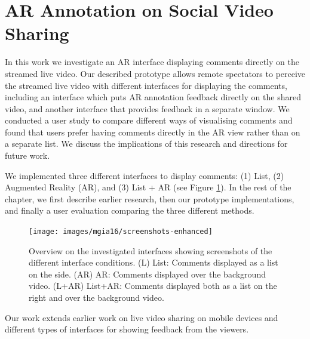 
\section{AR Annotation on Social Video Sharing}
\label{sec:video}

In this work we investigate an AR interface displaying comments directly on the streamed live video. Our described prototype allows remote spectators to perceive the streamed live video with different interfaces for displaying the comments, including an interface which puts AR annotation feedback directly on the shared video, and another interface that provides feedback in a separate window. We conducted a user study to compare different ways of visualising comments and found that users prefer having comments directly in the AR view rather than on a separate list. We discuss the implications of this research and directions for future work.

We implemented three different interfaces to display comments: (1) List, (2) Augmented Reality (AR), and (3) List + AR (see Figure \ref{fig:mgia16:conditions}). In the rest of the chapter, we first describe earlier research, then our prototype implementations, and finally a user evaluation comparing the three different methods. 

\begin{figure}
  \texttt{[image: images/mgia16/screenshots-enhanced]}
  \caption{Overview on the investigated interfaces showing screenshots of the different interface conditions. (L) List: Comments displayed as a list on the side. (AR) AR: Comments displayed over the background video. (L+AR) List+AR: Comments displayed both as a list on the right and over the background video. }
  \label{fig:mgia16:conditions}
\end{figure}

Our work extends earlier work on live video sharing on mobile devices and different types of interfaces for showing feedback from the viewers. 




